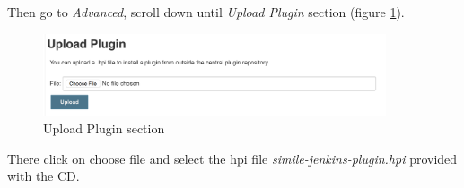 Then go to \textit{Advanced}, scroll down until \textit{Upload Plugin} section (figure \ref{fig:jenkins-plugin-03}).

\begin{figure}[H]
	\centering
    \includegraphics[width=0.9\textwidth]{grafiken/jenkins-plugin-03}
    \caption{Upload Plugin section}
    \label{fig:jenkins-plugin-03}
\end{figure}

There click on choose file and select the hpi file \textit{simile-jenkins-plugin.hpi} provided with the CD.